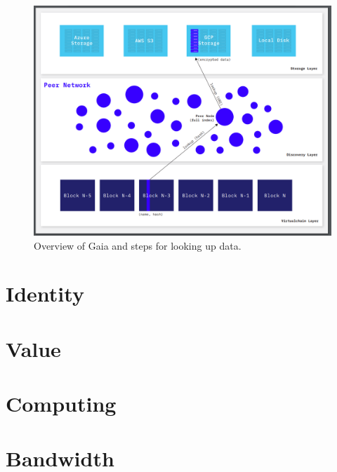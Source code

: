 		\begin{figure}[h]
			\includegraphics[width=\linewidth]{figures/gaia-overview}
			\caption{\label{fig:gaia-overview} Overview of Gaia and steps for looking up data.\protect\footnotemark}
		\end{figure}
		
	
\section{Identity}
	
\section{Value}
	
\section{Computing}
	
\section{Bandwidth}